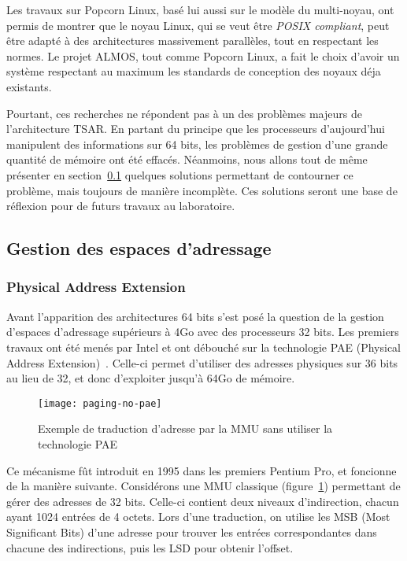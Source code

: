       Les travaux sur Popcorn Linux, basé lui aussi sur le modèle du
      multi-noyau, ont permis de montrer que le noyau Linux, qui se veut être
      \textit{POSIX compliant}, peut être adapté à des architectures massivement
      parallèles, tout en respectant les normes. Le projet ALMOS, tout comme
      Popcorn Linux, a fait le choix d'avoir un système respectant au maximum
      les standards de conception des noyaux déja existants.

      Pourtant, ces recherches ne répondent pas à un des problèmes majeurs de
      l'architecture TSAR. En partant du principe que les processeurs
      d'aujourd'hui manipulent des informations sur 64 bits, les problèmes de
      gestion d'une grande quantité de mémoire ont été effacés. Néanmoins, nous
      allons tout de même présenter en section~\ref{sec:memory} quelques
      solutions permettant de contourner ce problème, mais toujours de manière
      incomplète. Ces solutions seront une base de réflexion pour de futurs
      travaux au laboratoire.
    
     

  \subsection{Gestion des espaces d'adressage}
  \label{sec:memory}    

    \subsubsection{Physical Address Extension}

      Avant l'apparition des architectures 64 bits s'est posé la question de la
      gestion d'espaces d'adressage supérieurs à 4Go avec des processeurs 32
      bits. Les premiers travaux ont été menés par Intel et ont débouché sur la
      technologie PAE (Physical Address
      Extension)~\citep{patent6349380}. Celle-ci permet d'utiliser des adresses
      physiques sur 36 bits au lieu de 32, et donc d'exploiter jusqu'à 64Go de
      mémoire.

      \begin{figure}[h]
        \centering \texttt{[image: paging-no-pae]}
        \caption{Exemple de traduction d'adresse par la MMU sans utiliser la
          technologie PAE}
        \label{fig:paging-no-pae}
        \end{figure}
      
      Ce mécanisme fût introduit en 1995 dans les premiers Pentium Pro, et
      foncionne de la manière suivante. Considérons une MMU classique
      (figure~\ref{fig:paging-no-pae}) permettant de gérer des adresses de 32
      bits. Celle-ci contient deux niveaux d'indirection, chacun ayant 1024
      entrées de 4 octets. Lors d'une traduction, on utilise les MSB (Most
      Significant Bits) d'une adresse pour trouver les entrées correspondantes
      dans chacune des indirections, puis les LSD pour obtenir l'offset.

